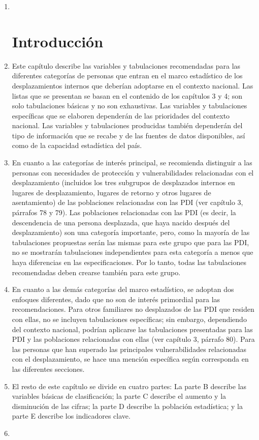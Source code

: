 \documentclass[
]{book}
\begin{document}
\begin{enumerate}
\def\labelenumi{\arabic{enumi}.}
\item ~
  \hypertarget{introducciuxf3n-3}{%
  \section{Introducción}\label{introducciuxf3n-3}}
\item
  Este capítulo describe las variables y tabulaciones recomendadas para las diferentes categorías de personas que entran en el marco estadístico de los desplazamientos internos que deberían adoptarse en el contexto nacional. Las listas que se presentan se basan en el contenido de los capítulos 3 y 4; son solo tabulaciones básicas y no son exhaustivas. Las variables y tabulaciones específicas que se elaboren dependerán de las prioridades del contexto nacional. Las variables y tabulaciones producidas también dependerán del tipo de información que se recabe y de las fuentes de datos disponibles, así como de la capacidad estadística del país.
\item
  En cuanto a las categorías de interés principal, se recomienda distinguir a las personas con necesidades de protección y vulnerabilidades relacionadas con el desplazamiento (incluidos los tres subgrupos de desplazados internos en lugares de desplazamiento, lugares de retorno y otros lugares de asentamiento) de las poblaciones relacionadas con las PDI (ver capítulo 3, párrafos 78 y 79). Las poblaciones relacionadas con las PDI (es decir, la descendencia de una persona desplazada, que haya nacido después del desplazamiento) son una categoría importante, pero, como la mayoría de las tabulaciones propuestas serán las mismas para este grupo que para las PDI, no se mostrarán tabulaciones independientes para esta categoría a menos que haya diferencias en las especificaciones. Por lo tanto, todas las tabulaciones recomendadas deben crearse también para este grupo.
\item
  En cuanto a las demás categorías del marco estadístico, se adoptan dos enfoques diferentes, dado que no son de interés primordial para las recomendaciones. Para otros familiares no desplazados de las PDI que residen con ellas, no se incluyen tabulaciones específicas; sin embargo, dependiendo del contexto nacional, podrían aplicarse las tabulaciones presentadas para las PDI y las poblaciones relacionadas con ellas (ver capítulo 3, párrafo 80). Para las personas que han superado las principales vulnerabilidades relacionadas con el desplazamiento, se hace una mención específica según corresponda en las diferentes secciones.
\item
  El resto de este capítulo se divide en cuatro partes: La parte B describe las variables básicas de clasificación; la parte C describe el aumento y la disminución de las cifras; la parte D describe la población estadística; y la parte E describe los indicadores clave.
\item ~
  \hypertarget{variables-clasificatorias-buxe1sicas}{%
}
\end{enumerate}
\end{document}
